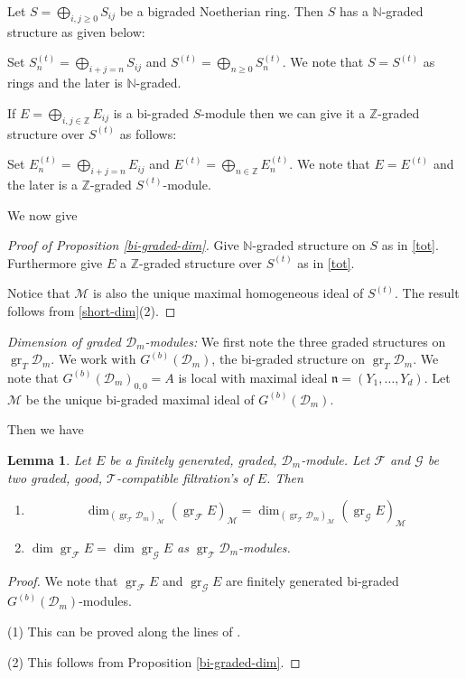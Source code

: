 \documentclass{amsart}
\newcommand{\ZZ}{\mathbb{Z} }
\newcommand{\D}{\mathcal{D} }
\newcommand{\T}{\mathcal{T} }
\newcommand{\F}{\mathcal{F} }
\newcommand{\G}{\mathcal{G} }
\newcommand{\n}{\mathfrak{n} }
\newcommand{\M}{\mathcal{M} }
\newcommand{\gr}{\operatorname{gr}}
\theoremstyle{plain}
\newtheorem{lemma}[theorem]{Lemma}
\theoremstyle{definition}
\theoremstyle{remark}
\begin{document}
Let $S = \bigoplus_{i,j \geq 0} S_{ij}$ be a bigraded Noetherian ring. Then
$S$ has a $\mathbb{N}$-graded structure as given below:

Set $S^{(t)}_n  = \bigoplus_{i+j = n} S_{ij} $ and
 $S^{(t)} = \bigoplus_{n \geq 0} S^{(t)}_n$.
 We note that $S = S^{(t)}$ as rings and the later is $\mathbb{N}$-graded.
 
 If   $E = \bigoplus_{i,j \in \ZZ} E_{ij}$ is a bi-graded $S$-module then we can 
 give it a $\ZZ$-graded structure over $S^{(t)}$ as follows: 
 
 Set $E^{(t)}_n  = \bigoplus_{i+j = n} E_{ij} $ and
 $E^{(t)} = \bigoplus_{n \in \ZZ} E^{(t)}_n$. We note that $E = E^{(t)}$ and the later is a $\ZZ$-graded $S^{(t)}$-module.
 
 We now give
 \begin{proof}[Proof of Proposition \ref{bi-graded-dim}]
 Give $\mathbb{N}$-graded structure on $S$ as in \ref{tot}. Furthermore give
 $E$ a $\ZZ$-graded structure over $S^{(t)}$ as in \ref{tot}.
 
 Notice that $\mathcal{M}$ is also the unique maximal homogeneous ideal of $S^{(t)}$. The result follows from \ref{short-dim}(2).
 \end{proof}
 
 
\s \textit{Dimension of graded $\D_m$-modules:}
We first note the three graded structures on $\gr_T \D_m$. We work with 
$G^{(b)}(\D_m)$, the bi-graded structure on $\gr_T \D_m$. We note that $G^{(b)}(\D_m)_{0,0} = A$ is local with maximal ideal 
$\n = (Y_1,\ldots, Y_d)$. Let $\M$ be the unique bi-graded maximal ideal of $G^{(b)}(\D_m)$.

Then we have
\begin{lemma}\label{local-dim}
Let $E$ be a  finitely generated, graded, $\D_m$-module. Let $\F$ and $\G$ be two graded,  good, $\T$-compatible filtration's of $E$. Then
\begin{enumerate}[\rm (1)]
\item
\[
\dim_{(\gr_\T \D_m)_\M} (\gr_\F E)_\M  =  \dim_{(\gr_\T \D_m)_\M} (\gr_\G E)_\M
\]
\item
$ \dim \gr_\F E = \dim \gr_\G E$ as $\gr_\T \D_m$-modules.
\end{enumerate}
\end{lemma}
\begin{proof}
We note that $\gr_\F E$ and $\gr_\G E$ are finitely generated  bi-graded $G^{(b)}(\D_m)$-modules.

(1) This can be proved along the lines of \cite[2.6.2]{Bjork}.

(2) This follows from  Proposition \ref{bi-graded-dim}.
\end{proof}
 
\end{document}
